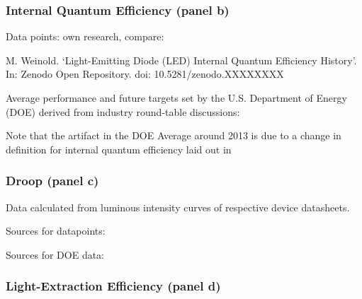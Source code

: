 \documentclass[10pt]{article}
\begin{document}
\subsubsection{Internal Quantum Efficiency (panel b)}

Data points: own research, compare:

M. Weinold. ‘Light-Emitting Diode (LED) Internal Quantum Efficiency History’.
In: Zenodo Open Repository. doi: 10.5281/zenodo.XXXXXXXX

Average performance and future targets set by the U.S. Department of Energy (DOE) derived from industry round-table discussions:

\cite{doe_ssl_multiyear_2006}\cite{doe_ssl_multiyear_2007}\cite{doe_ssl_multiyear_2008}\cite{doe_ssl_multiyear_2009}\cite{doe_ssl_multiyear_2010}\cite{doe_ssl_multiyear_2011}\cite{doe_ssl_multiyear_2012}\cite{doe_ssl_multiyear_2013}\cite{doe_ssl_multiyear_2014}\cite{doe_ssl_rnd_2015}\cite{doe_ssl_rnd_2016}

Note that the artifact in the DOE Average around 2013 is due to a change in definition for internal quantum efficiency laid out in \cite{doe_ssl_multiyear_2013}

\subsubsection{Droop (panel c)}

Data calculated from luminous intensity curves of respective device datasheets.

Sources for datapoints: \cite{datasheet_osram_topled}\cite{osram2008data}\cite{osram2008gdplus}\cite{osram2018csp}\cite{datasheet_lumileds_lux1}\cite{lumi2008data}\cite{lumi2016data_1}\cite{lumi2016data_2}\cite{samsung2018data}

Sources for DOE data: \cite{doe_ssl_multiyear_2010}\cite{doe_ssl_multiyear_2011}\cite{doe_ssl_multiyear_2012}\cite{doe_ssl_multiyear_2013}\cite{doe_ssl_multiyear_2014}\cite{doe_ssl_rnd_2015}\cite{doe_ssl_rnd_2016}

\subsubsection{Light-Extraction Efficiency (panel d)}

\cite{lee2005analysis}\cite{krames2007status}\cite{Jang2004}\cite{Horng2013}\cite{Liao2010}\cite{HungWenHuang2005}\cite{Leem2007}\cite{Huang2008}\cite{Wang2009}\cite{Huh2003}\cite{Horng2008}\cite{Gao2008}\cite{Chang2003}\cite{Zhou2012}\cite{ChunJuTun2006}\cite{Hua2009}\cite{Matioli2010} \newline
\cite{lee2005analysis}\cite{Zhu2015}\cite{Ding2015}\cite{Taki2019}\cite{Shchekin2006}\cite{Hu2016}\cite{Horng2010}\cite{Lin2016}\cite{Yue2018}\cite{Zhao2012}\cite{Zhu2015}\cite{Ding2015}\cite{wierer2001high}\cite{Steigerwald2002}\cite{DaeSeobHan2006}\cite{Wang2006}\cite{Lee2007}\cite{Shen2007}\cite{Huang2006}\cite{Zhmakin2011}

\newpage


\end{document}
